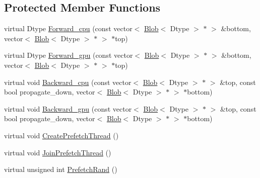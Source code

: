 \subsection*{Protected Member Functions}
\begin{DoxyCompactItemize}
\item 
virtual Dtype \hyperlink{classcaffe_1_1_data_layer_a35e60c6ea0e3b8b57671d42853e956c3}{Forward\+\_\+cpu} (const vector$<$ \hyperlink{classcaffe_1_1_blob}{Blob}$<$ Dtype $>$ $\ast$ $>$ \&bottom, vector$<$ \hyperlink{classcaffe_1_1_blob}{Blob}$<$ Dtype $>$ $\ast$ $>$ $\ast$top)
\item 
virtual Dtype \hyperlink{classcaffe_1_1_data_layer_ae94ad93e1ad35123624e0aba0a2f03c6}{Forward\+\_\+gpu} (const vector$<$ \hyperlink{classcaffe_1_1_blob}{Blob}$<$ Dtype $>$ $\ast$ $>$ \&bottom, vector$<$ \hyperlink{classcaffe_1_1_blob}{Blob}$<$ Dtype $>$ $\ast$ $>$ $\ast$top)
\item 
virtual void \hyperlink{classcaffe_1_1_data_layer_a4b58dd246c6d1d1c3950f8c344c8b5ac}{Backward\+\_\+cpu} (const vector$<$ \hyperlink{classcaffe_1_1_blob}{Blob}$<$ Dtype $>$ $\ast$ $>$ \&top, const bool propagate\+\_\+down, vector$<$ \hyperlink{classcaffe_1_1_blob}{Blob}$<$ Dtype $>$ $\ast$ $>$ $\ast$bottom)
\item 
virtual void \hyperlink{classcaffe_1_1_data_layer_a7d9d69b7d2fbb6635b677ade18d9d8be}{Backward\+\_\+gpu} (const vector$<$ \hyperlink{classcaffe_1_1_blob}{Blob}$<$ Dtype $>$ $\ast$ $>$ \&top, const bool propagate\+\_\+down, vector$<$ \hyperlink{classcaffe_1_1_blob}{Blob}$<$ Dtype $>$ $\ast$ $>$ $\ast$bottom)
\item 
virtual void \hyperlink{classcaffe_1_1_data_layer_a54227e2ee704bfa023013f8d3d42410e}{Create\+Prefetch\+Thread} ()
\item 
virtual void \hyperlink{classcaffe_1_1_data_layer_af74ca774cacdf52bcdd70046c4619fc8}{Join\+Prefetch\+Thread} ()
\item 
virtual unsigned int \hyperlink{classcaffe_1_1_data_layer_ab273ed9ed64cd430b2d84308958ee531}{Prefetch\+Rand} ()
\end{DoxyCompactItemize}
